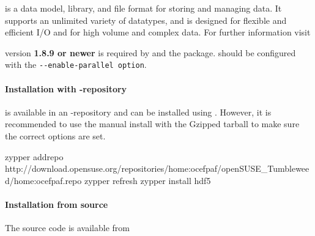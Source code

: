 % 
%               
%          
% 

\levelstay{\texorpdfstring{\protect\marktool{\hdfname}}{\hdfname{}}}

\marktool{\hdfname} is a data model, library, and file format for storing and managing data. It supports an unlimited variety of datatypes, and is designed for flexible and efficient I/O and for high volume and complex data. For further information visit

\href{\hdfaddress}{\hdfaddress}

\marktool[\hdfaddress]{\hdfname} version \textbf{1.8.9 or newer} is required by \marktool{\netcdfname} and the  \marktool{\trilinosname} package. \marktool[\hdfaddress]{\hdfname} should be configured with the \verb+--enable-parallel option+.

\paragraph{Installation with \texorpdfstring{\protect\marktool{\opensusename}}{\opensusename}-repository}

\marktool{\hdfname} is available in an \marktool{\opensusename}-repository and can be installed using \marktool{\zyppername}. However, it is recommended to use the manual install with the Gzipped tarball to make sure the correct options are set.

\begingroup
\lstset{breaklines=true}
\begin{code}
zypper addrepo http://download.opensuse.org/repositories/home:ocefpaf/openSUSE_Tumbleweed/home:ocefpaf.repo
zypper refresh
zypper install hdf5
\end{code}
\endgroup

\paragraph{Installation from source} The \marktool{\hdfname} source code is available from

